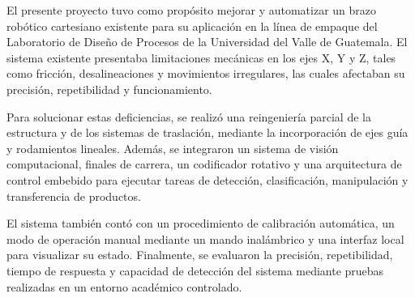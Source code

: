 El presente proyecto tuvo como propósito mejorar y automatizar un brazo robótico cartesiano existente para su aplicación en la línea de empaque del Laboratorio de Diseño de Procesos de la Universidad del Valle de Guatemala. El sistema existente presentaba limitaciones mecánicas en los ejes X, Y y Z, tales como fricción, desalineaciones y movimientos irregulares, las cuales afectaban su precisión, repetibilidad y funcionamiento.

Para solucionar estas deficiencias, se realizó una reingeniería parcial de la estructura y de los sistemas de traslación, mediante la incorporación de ejes guía y rodamientos lineales. Además, se integraron un sistema de visión computacional, finales de carrera, un codificador rotativo y una arquitectura de control embebido para ejecutar tareas de detección, clasificación, manipulación y transferencia de productos.

El sistema también contó con un procedimiento de calibración automática, un modo de operación manual mediante un mando inalámbrico y una interfaz local para visualizar su estado. Finalmente, se evaluaron la precisión, repetibilidad, tiempo de respuesta y capacidad de detección del sistema mediante pruebas realizadas en un entorno académico controlado.